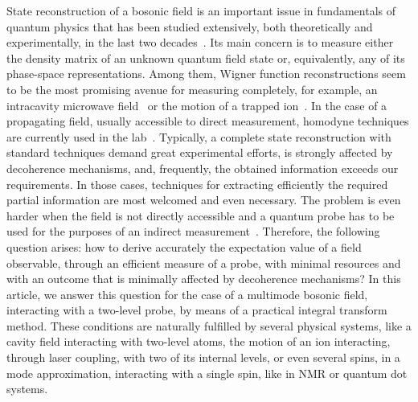 \documentclass[pra,aps,twocolumn,showpacs]{revtex4}
\begin{document}
State reconstruction of a bosonic field is an important issue in
fundamentals of quantum physics that has been studied extensively,
both theoretically and experimentally, in the last two
decades~\cite{SchleichBook}. Its main concern is to measure either
the density matrix of an unknown quantum field state or,
equivalently, any of its phase-space representations. Among them,
Wigner function reconstructions seem to be the most promising
avenue for measuring completely, for example, an intracavity
microwave field~\cite{Bertet} or the motion of a trapped
ion~\cite{Leibfried}. In the case of a propagating field, usually
accessible to direct measurement, homodyne techniques are
currently used in the lab~\cite{MandelWolf}. Typically, a complete
state reconstruction with standard techniques demand great
experimental efforts, is strongly affected by decoherence
mechanisms, and, frequently, the obtained information exceeds our
requirements. In those cases, techniques for extracting
efficiently the required partial information are most welcomed and
even necessary. The problem is even harder when the field is not
directly accessible and a quantum probe has to be used for the
purposes of an indirect measurement~\cite{Brune}. Therefore, the
following question arises: how to derive accurately the
expectation value of a field observable, through an efficient
measure of a probe, with minimal resources and with an outcome
that is minimally affected by decoherence mechanisms? In this
article, we answer this question for the case of a multimode
bosonic field, interacting with a two-level probe, by means of a
practical integral transform method. These conditions are
naturally fulfilled by several physical systems, like a cavity
field interacting with two-level atoms, the motion of an ion
interacting, through laser coupling, with two of its internal
levels, or even several spins, in a mode approximation,
interacting with a single spin, like in NMR or quantum dot
systems.
\end{document}
